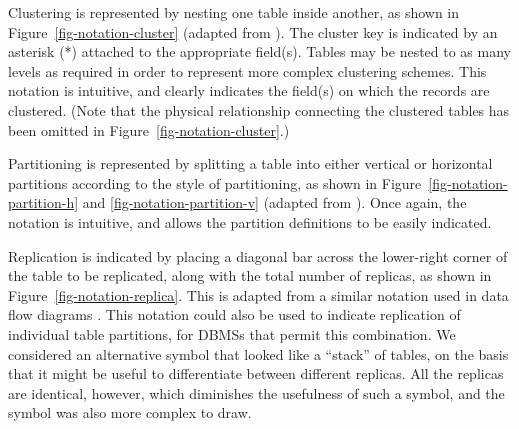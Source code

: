 \documentclass{CRPITStyle}
\begin{document}
Clustering is represented by nesting one table inside another, as shown
in Figure~\ref{fig-notation-cluster} (adapted from
\cite{BeDa-P-1992-PDD}). The cluster key is indicated by an asterisk (*)
attached to the appropriate field(s). Tables may be nested to as many
levels as required in order to represent more complex clustering
schemes. This notation is intuitive, and clearly indicates the field(s)
on which the records are clustered. (Note that the physical relationship
connecting the clustered tables has been omitted in
Figure~\ref{fig-notation-cluster}.)

Partitioning is represented by splitting a table into either vertical or
horizontal partitions according to the style of partitioning, as shown
in Figure~\ref{fig-notation-partition-h} and
\ref{fig-notation-partition-v} (adapted from \cite{Silb-A-2002-4E}).
Once again, the notation is intuitive, and allows the partition
definitions to be easily indicated.

Replication is indicated by placing a diagonal bar across the
lower-right corner of the table to be replicated, along with the total
number of replicas, as shown in Figure~\ref{fig-notation-replica}. This
is adapted from a similar notation used in data flow diagrams
\cite{Gane-C-1979}. This notation could also be used to indicate
replication of individual table partitions, for DBMSs that permit this
combination. We considered an alternative symbol that looked like a
``stack'' of tables, on the basis that it might be useful to
differentiate between different replicas. All the replicas are
identical, however, which diminishes the usefulness of such a symbol,
and the symbol was also more complex to draw.
\end{document}
